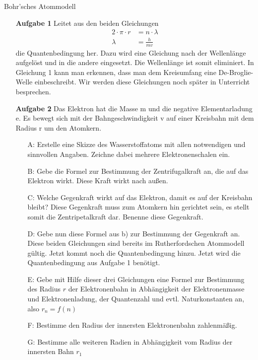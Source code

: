 \documentclass[11pt,a4paper,oneside]{article}
\begin{document}
	\begin{aufgabe}{Bohr'sches Atommodell}
		\small
		\begin{itemize}[left=20mm]
			\item [\textbf{Aufgabe 1}] Leitet aus den beiden Gleichungen 
			\begin{align*}
				2 \cdot \pi \cdot r &= n \cdot \lambda \\
				\lambda &= \frac{h}{mv}
			\end{align*}
			die Quantenbedingung her. Dazu wird eine Gleichung nach der Wellenlänge aufgelöst und in die
			andere eingesetzt. Die Wellenlänge ist somit eliminiert. In Gleichung 1 kann man erkennen, dass man
			dem Kreisumfang eine De-Broglie-Welle einbeschreibt. Wir werden diese Gleichungen noch später in
			Unterricht besprechen.
			\item [\textbf{Aufgabe 2}] 
			Das Elektron hat die Masse m und die negative Elementarladung e. Es bewegt sich mit der Bahngeschwindigkeit v auf einer Kreisbahn mit dem Radius r um den Atomkern.
			\begin{itemize}[left=-10mm]
				\item [A:] Erstelle eine Skizze des Wasserstoffatoms mit allen notwendigen und sinnvollen Angaben. Zeichne dabei mehrere Elektronenschalen ein.
				\item [B:] Gebe die Formel zur Bestimmung der Zentrifugalkraft an, die auf das Elektron wirkt. Diese
				Kraft wirkt nach außen.
				\item [C:] Welche Gegenkraft wirkt auf das Elektron, damit es auf der Kreisbahn bleibt? Diese Gegenkraft muss zum Atomkern hin gerichtet sein, es stellt somit die Zentripetalkraft dar. Benenne diese Gegenkraft.
				\item [D:] Gebe nun diese Formel aus b) zur Bestimmung der Gegenkraft an. \\
				Diese beiden Gleichungen sind bereits im Rutherfordschen Atommodell gültig. Jetzt kommt noch die
				Quantenbedingung hinzu. Jetzt wird die Quantenbedingung aus Aufgabe 1 benötigt.
				\item [E:]  Gebe mit Hilfe dieser drei Gleichungen eine Formel zur Bestimmung des Radius $r$ der Elektronenbahn in Abhängigkeit der Elektronenmasse und Elektronenladung, der Quantenzahl und
				evtl. Naturkonstanten an, also $r_n = f(n)$
				\item [F:] Bestimme den Radius der innersten Elektronenbahn zahlenmäßig.
				\item [G:] Bestimme alle weiteren Radien in Abhängigkeit vom Radius der innersten Bahn $r_1$

\end{itemize}
\end{itemize}
\end{aufgabe}
\end{document}
